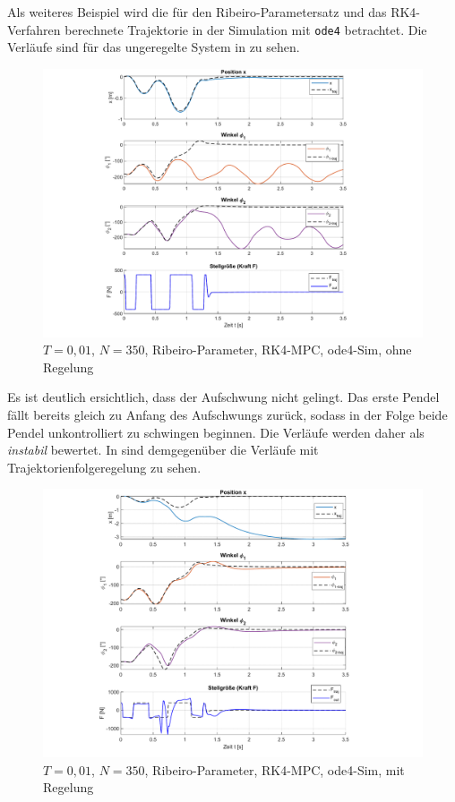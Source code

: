 Als weiteres Beispiel wird die für den Ribeiro-Parametersatz und das RK4-Verfahren berechnete Trajektorie in der Simulation mit \texttt{ode4} betrachtet. Die Verläufe sind für das ungeregelte System in  zu sehen. 
\begin{figure}[h]
	\centering
		\includegraphics[scale=\scaleyplots]{Bilder/Trajektorien/F400T0.01_rib_rk4_ode4.pdf}
	\caption{$T=0,01$, $N=350$, Ribeiro-Parameter, RK4-MPC, ode4-Sim, ohne Regelung}
	\label{fig:F400T0.01_rib_rk4_ode4}
\end{figure}

Es ist deutlich ersichtlich, dass der Aufschwung nicht gelingt. Das erste Pendel fällt bereits gleich zu Anfang des Aufschwungs zurück, sodass in der Folge beide Pendel unkontrolliert zu schwingen beginnen. Die Verläufe werden daher als \textit{instabil} bewertet.
In  sind demgegenüber die Verläufe mit Trajektorienfolgeregelung zu sehen. 
\begin{figure}[h]
	\centering
		\includegraphics[scale=\scaleyplots]{Bilder/Trajektorien/F400T0.01_rib_rk4_ode4_TFR_QR-alt.pdf}
	\caption{$T=0,01$, $N=350$, Ribeiro-Parameter, RK4-MPC, ode4-Sim, mit Regelung}
	\label{fig:F400T0.01_rib_rk4_ode4_TFR_QR-alt}
\end{figure}

